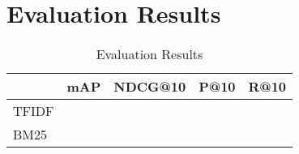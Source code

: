 \section{Evaluation Results}


\begin{table}[]
\center
\begin{tabular}{|l|l|l|l|l|}
\hline
      & mAP & NDCG@10 & P@10 & R@10 \\
\hline
TFIDF &     &         &      &      \\
\hline
BM25  &     &         &      &      \\
\hline
\end{tabular}
\caption{Evaluation Results}
\label{table:results}
\end{table}


